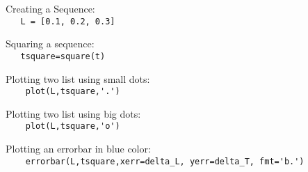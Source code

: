 Creating a Sequence:\\
{\ex \lstinline|   L = [0.1, 0.2, 0.3] |}

Squaring a sequence:\\
{\ex \lstinline|   tsquare=square(t) |}

Plotting two list using small dots:\\
{\ex \lstinline|    plot(L,tsquare,'.') |}

Plotting two list using big dots:\\
{\ex \lstinline|    plot(L,tsquare,'o') |}

Plotting an errorbar in blue color:\\
{\ex \lstinline|    errorbar(L,tsquare,xerr=delta_L, yerr=delta_T, fmt='b.') |}

